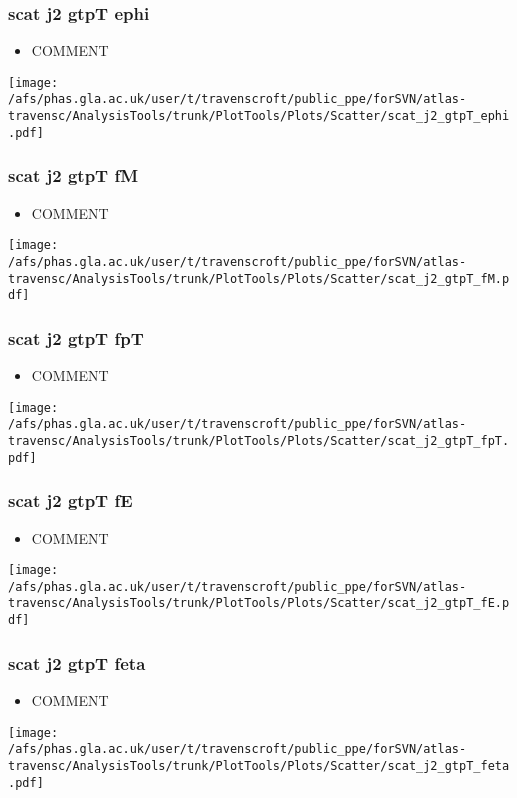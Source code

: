 \documentclass{beamer}
\begin{document}
\begin{frame}
\frametitle{scat j2 gtpT ephi}
\begin{itemize}
\item COMMENT
\end{itemize}
\begin{center}
\texttt{[image: /afs/phas.gla.ac.uk/user/t/travenscroft/public\_ppe/forSVN/atlas-travensc/AnalysisTools/trunk/PlotTools/Plots/Scatter/scat\_j2\_gtpT\_ephi.pdf]}
\end{center}
\end{frame}

\begin{frame}
\frametitle{scat j2 gtpT fM}
\begin{itemize}
\item COMMENT
\end{itemize}
\begin{center}
\texttt{[image: /afs/phas.gla.ac.uk/user/t/travenscroft/public\_ppe/forSVN/atlas-travensc/AnalysisTools/trunk/PlotTools/Plots/Scatter/scat\_j2\_gtpT\_fM.pdf]}
\end{center}
\end{frame}

\begin{frame}
\frametitle{scat j2 gtpT fpT}
\begin{itemize}
\item COMMENT
\end{itemize}
\begin{center}
\texttt{[image: /afs/phas.gla.ac.uk/user/t/travenscroft/public\_ppe/forSVN/atlas-travensc/AnalysisTools/trunk/PlotTools/Plots/Scatter/scat\_j2\_gtpT\_fpT.pdf]}
\end{center}
\end{frame}

\begin{frame}
\frametitle{scat j2 gtpT fE}
\begin{itemize}
\item COMMENT
\end{itemize}
\begin{center}
\texttt{[image: /afs/phas.gla.ac.uk/user/t/travenscroft/public\_ppe/forSVN/atlas-travensc/AnalysisTools/trunk/PlotTools/Plots/Scatter/scat\_j2\_gtpT\_fE.pdf]}
\end{center}
\end{frame}

\begin{frame}
\frametitle{scat j2 gtpT feta}
\begin{itemize}
\item COMMENT
\end{itemize}
\begin{center}
\texttt{[image: /afs/phas.gla.ac.uk/user/t/travenscroft/public\_ppe/forSVN/atlas-travensc/AnalysisTools/trunk/PlotTools/Plots/Scatter/scat\_j2\_gtpT\_feta.pdf]}
\end{center}
\end{frame}
\end{document}
